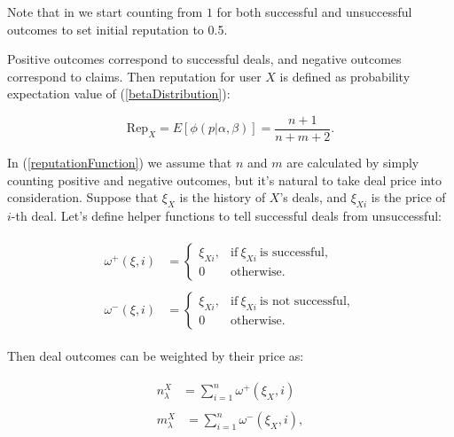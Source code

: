 \documentclass[11pt]{article}
\begin{document}
Note that in \cite{josang2002beta} we start counting from $ 1 $ for both successful and unsuccessful outcomes to set initial reputation to 0.5.

Positive outcomes correspond to successful deals, and negative outcomes correspond to claims. Then  reputation for user $ X $ is defined as probability expectation value of (\ref{betaDistribution}):

\begin{equation} \label{reputationFunction}
\text{Rep}_{X} = E[\phi(p | \alpha, \beta)] = \frac{n + 1}{n + m + 2}.
\end{equation}

In (\ref{reputationFunction}) we assume that $ n $ and $ m $ are calculated by simply counting positive and negative outcomes, but it's natural to take deal price into consideration. Suppose that $ \xi_{X} $ is the history of $ X $'s deals, and $ \xi_{Xi} $ is the price of $ i $-th deal. Let's define helper functions to tell successful deals from unsuccessful:

\begin{align}
\begin{split}
\omega^{+}(\xi, i) {}& = \begin{cases} \xi_{Xi}, & \text{if}\ \xi_{Xi}\ \mbox{is successful}, \\ 0 & \mbox{otherwise.} \end{cases}
\end{split} \\
\begin{split}
\omega^{-}(\xi, i) {}& = \begin{cases} \xi_{Xi}, & \text{if}\ \xi_{Xi}\ \mbox{is not successful}, \\ 0 & \mbox{otherwise.} \end{cases}
\end{split}
\end{align}

Then deal outcomes can be weighted by their price as:

\begin{align}
\begin{split}
n_{\lambda}^{X} {}& = \sum_{i = 1}^{n} \omega^{+}(\xi_X, i)
\end{split} \\
\begin{split}
m_{\lambda}^{X} {}& = \sum_{i = 1}^{n} \omega^{-}(\xi_X, i),
\end{split}
\end{align}
\end{document}
